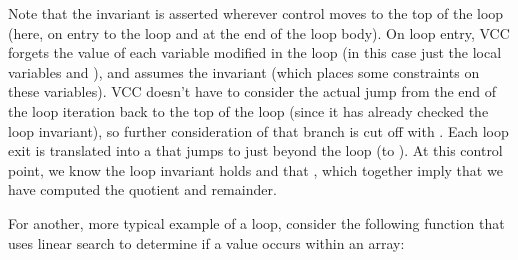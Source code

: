 Note that the invariant is asserted wherever control moves to the top of the
loop (here, on entry to the loop and at the end of the loop body). On
loop entry, VCC forgets the value of each variable modified in the
loop (in this case just the local variables  and ),
and assumes the invariant (which places some constraints on these
variables).  VCC doesn't have to consider the actual jump from the end
of the loop iteration back to the top of the loop (since it has
already checked the loop invariant), so further consideration of that
branch is cut off with .  Each loop exit is
translated into a  that jumps to just beyond the loop (to
). At this control point, we know the loop invariant
holds and that , which together imply that we have
computed the quotient and remainder.



For another, more typical example of a loop, consider 
the following function that uses linear search to determine if a value
occurs within an array:




